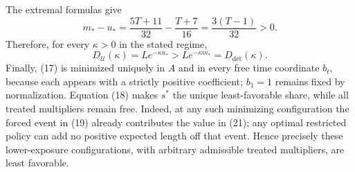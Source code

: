 The extremal formulas give
\[
 m_*-u_*=\frac{5T+11}{32}-\frac{T+7}{16}
 =\frac{3(T-1)}{32}>0.
\]
Therefore, for every \(\kappa>0\) in the stated regime,
\[
 D_{\mathcal U}(\kappa)=Le^{-\kappa u_*}
 >Le^{-\kappa m_*}=D_{\mathrm{det}}(\kappa).
\]
Finally, (17) is minimized uniquely in \(A\) and in every free time coordinate \(b_t\), because each appears with a strictly positive coefficient; \(b_1=1\) remains fixed by normalization.  Equation (18) makes \(s^*\) the unique least-favorable share, while all treated multipliers remain free.  Indeed, at any such minimizing configuration the forced event in (19) already contributes the value in (21); any optimal restricted policy can add no positive expected length off that event.  Hence precisely these lower-exposure configurations, with arbitrary admissible treated multipliers, are least favorable.
